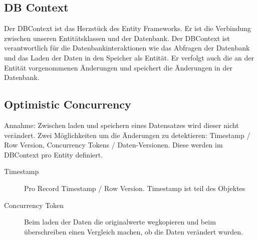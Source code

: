 \subsection{DB Context}
Der DBContext ist das Herzstück des Entity Frameworks. Er ist die Verbindung zwischen unseren Entitätsklassen und der Datenbank. Der DBContext ist verantwortlich für die Datenbankinteraktionen wie das Abfragen der Datenbank und das Laden der Daten in den Speicher als Entität. Er verfolgt auch die an der Entität vorgenommenen Änderungen und speichert die Änderungen in der Datenbank.

\subsection{Optimistic Concurrency}
Annahme: Zwischen laden und speichern eines Datensatzes wird dieser nicht verändert. Zwei Möglichkeiten um die Änderungen zu detektieren: Timestamp / Row Version, Concurrency Tokens / Daten-Versionen. Diese werden im DBContext pro Entity definiert.

\begin{description}
  \item[Timestamp] Pro Record Timestamp / Row Version. Timestamp ist teil des Objektes
  \item[Concurrency Token] Beim laden der Daten die originalwerte wegkopieren und beim überschreiben einen Vergleich machen, ob die Daten verändert wurden.
\end{description}


\pagebreak